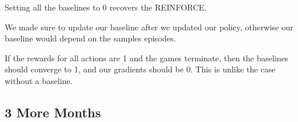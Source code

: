 \documentclass{article}
\begin{document}
Setting all the baselines to 0 recovers the REINFORCE.

We made sure to update our baseline after we updated our policy, otherwise our baseline would depend on the samples episodes.

If the rewards for all actions are 1 and the games terminate, then the baselines should converge to 1, and our gradients should be 0. This is unlike the case without a baseline.

\subsection{3 More Months}
\end{document}
